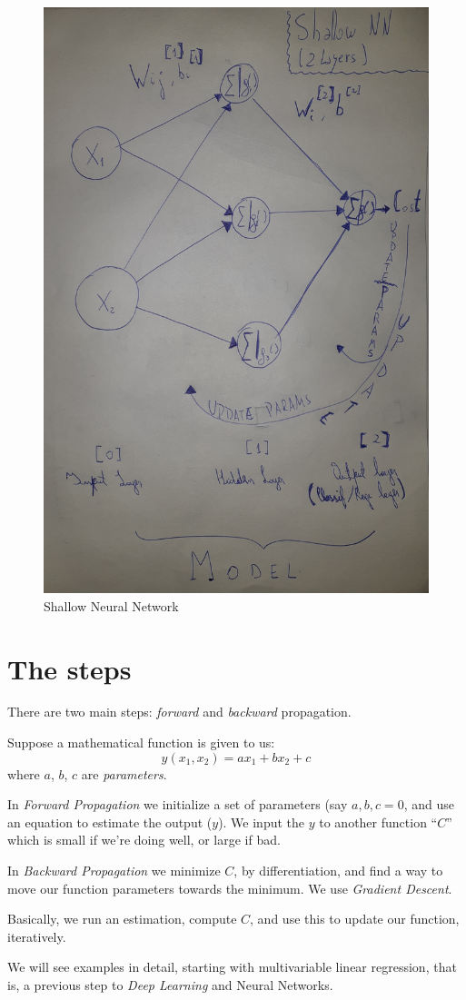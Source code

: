 \begin{figure}
 \centering
 \includegraphics[angle=-90,origin=c, width=\textwidth]{2L-NN.jpg}
 \caption{Shallow Neural Network}
 \label{fig:shallow}
\end{figure}

\section{The steps}
There are two main steps: \textit{forward} and \textit{backward} propagation. 

Suppose a mathematical function is given to us:
$$ y(x_1,x_2) = a x_1 + b x_2 + c$$
where $a$, $b$, $c$ are \textit{parameters}.

In \textit{Forward Propagation} we initialize a set of parameters (say $a,b,c=0$, and use an equation to estimate the output ($y$). We input the $y$ to another function ``$C$'' which is small if we're doing well, or large if bad.

In \textit{Backward Propagation} we minimize $C$, by differentiation, and find a way to move our function parameters towards the minimum. We use \textit{Gradient Descent}.

Basically, we run an estimation, compute $C$, and use this to update our function, iteratively.

We will see examples in detail, starting with multivariable linear regression, that is, a previous step to \textit{Deep Learning} and Neural Networks.
